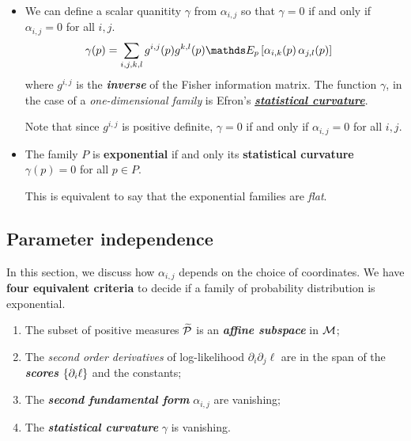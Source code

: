 \documentclass[11pt]{article}
\begin{document}
\begin{itemize}
\item \begin{definition}
We can define a scalar quanitity $\gamma$ from $\alpha_{i,j}$ so that $\gamma = 0$ if and only if $\alpha_{i,j} = 0$ for all $i,j$. 
\begin{align}
\gamma(p)  &= \sum_{i,j,k,l}g^{i,j}(p)g^{k,l}(p)\E{p}{\alpha_{i,k}(p)\, \alpha_{j,l}(p)} \label{eqn: stats_curvature}
\end{align} where $g^{i,j}$ is the \emph{\textbf{inverse}} of the Fisher information matrix.  The function $\gamma$, in the case of a \emph{one-dimensional family} is Efron's \underline{\emph{\textbf{statistical curvature}}}.
\end{definition} 

Note that since $g^{i,j}$ is positive definite, $\gamma = 0$ if and only if $\alpha_{i,j} = 0$ for all $i,j$.

\item 
\begin{proposition}
The family $P$ is \textbf{exponential} if and only its \textbf{statistical curvature} $\gamma(p) = 0$ for all $p \in P$.
\end{proposition}

This is equivalent to say that the exponential families are \emph{flat}.
\end{itemize}

\subsection{Parameter independence}
In this section, we discuss how $\alpha_{i,j}$ depends on the choice of coordinates. We have \textbf{four equivalent criteria} to decide if a family of probability distribution is exponential. 
\begin{enumerate}
\item The subset of positive measures $\widetilde{{\mathcal P}}$ is an \emph{\textbf{affine subspace}} in ${\mathcal M}$;
\item The \emph{second order derivatives} of log-likelihood $\partial_i \partial_j \ell$ are in the span of the \textbf{\emph{scores}} $\left\{\partial_i \ell\right\}$ and the constants; 
\item The \emph{\textbf{second fundamental form}} $\alpha_{i,j}$ are vanishing;
\item The \emph{\textbf{statistical curvature}} $\gamma$ is vanishing.
\end{enumerate}
\end{document}
